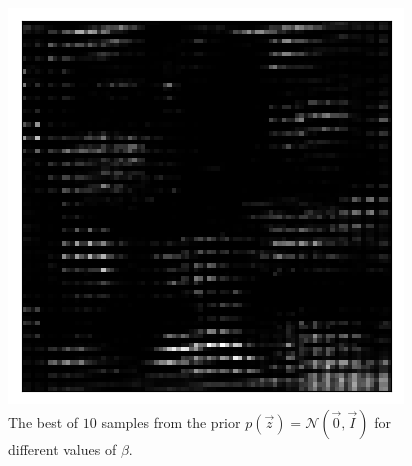\begin{figure}[h!]
\begin{multicols}{3}
    \caption{$\beta=2$}
    \includegraphics[scale=0.4]{figures/results/latent_image/beta_4_prior_sample_3.png}
    \caption{$\beta=4$}
\end{multicols}
\caption{The best of $10$ samples from the prior $p(\vec{z}) = \mathcal{N}(\vec{0}, \vec{I})$ for different values of $\beta$.}
\label{fig:latent_image_originals_prior_samples}
\end{figure}


